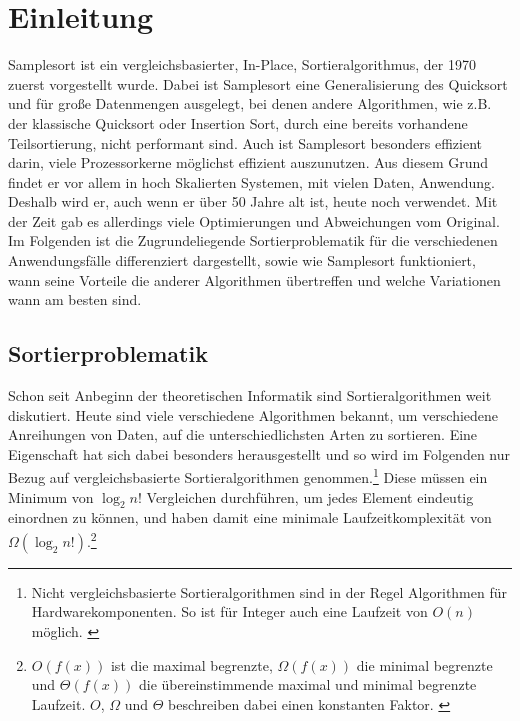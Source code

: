 \section{Einleitung}
	Samplesort ist ein vergleichsbasierter, In-Place, Sortieralgorithmus, der 1970 zuerst vorgestellt wurde. \autocite{frazer-1970}
	Dabei ist Samplesort eine Generalisierung des Quicksort und für große Datenmengen ausgelegt, bei denen andere Algorithmen, wie z.B. der klassische Quicksort oder Insertion Sort, durch eine bereits vorhandene Teilsortierung, nicht performant sind.
	Auch ist Samplesort besonders effizient darin, viele Prozessorkerne möglichst effizient auszunutzen.
	Aus diesem Grund findet er vor allem in hoch Skalierten Systemen, mit vielen Daten, Anwendung.\\
	Deshalb wird er, auch wenn er über 50 Jahre alt ist, heute noch verwendet.
	Mit der Zeit gab es allerdings viele Optimierungen und Abweichungen vom Original.
	Im Folgenden ist die Zugrundeliegende Sortierproblematik für die verschiedenen Anwendungsfälle differenziert dargestellt, sowie wie Samplesort funktioniert, wann seine Vorteile die anderer Algorithmen übertreffen und welche Variationen wann am besten sind.
	
	\subsection{Sortierproblematik}
		Schon seit Anbeginn der theoretischen Informatik sind Sortieralgorithmen weit diskutiert.
		Heute sind viele verschiedene Algorithmen bekannt, um verschiedene Anreihungen von Daten, auf die unterschiedlichsten Arten zu sortieren.
		Eine Eigenschaft hat sich dabei besonders herausgestellt und so wird im Folgenden nur Bezug auf vergleichsbasierte Sortieralgorithmen genommen.\footnote{Nicht vergleichsbasierte Sortieralgorithmen sind in der Regel Algorithmen für Hardwarekomponenten. So ist für Integer auch eine Laufzeit von $O(n)$ möglich. \autocite{abdel-hafeez-2017}}
		Diese müssen ein Minimum von $\log_2{n!}$ Vergleichen durchführen, um jedes Element eindeutig einordnen zu können, und haben damit eine minimale Laufzeitkomplexität von $\Omega(\log_2{n!})$.\footnote{$O(f(x))$ ist die maximal begrenzte, $\Omega(f(x))$ die minimal begrenzte und $\Theta(f(x))$ die übereinstimmende maximal und minimal begrenzte Laufzeit. $O$, $\Omega$ und $\Theta$ beschreiben dabei einen konstanten Faktor. \autocite[4]{sedgewick-1996}}
	
